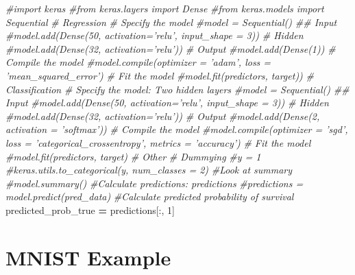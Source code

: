 \documentclass[]{book}
\newenvironment{Shaded}{\begin{snugshade}}{\end{snugshade}}
\newcommand{\DecValTok}[1]{\textcolor[rgb]{0.00,0.00,0.81}{#1}}
\newcommand{\CommentTok}[1]{\textcolor[rgb]{0.56,0.35,0.01}{\textit{#1}}}
\newcommand{\OperatorTok}[1]{\textcolor[rgb]{0.81,0.36,0.00}{\textbf{#1}}}
\newcommand{\NormalTok}[1]{#1}
\begin{document}
\begin{Shaded}
\begin{Highlighting}[]
\CommentTok{#import keras}
\CommentTok{#from keras.layers import Dense}
\CommentTok{#from keras.models import Sequential}
\CommentTok{# Regression}
\CommentTok{# Specify the model}
\CommentTok{#model = Sequential()}
\CommentTok{## Input}
\CommentTok{#model.add(Dense(50, activation='relu', input_shape = 3))}
\CommentTok{# Hidden}
\CommentTok{#model.add(Dense(32, activation='relu'))}
\CommentTok{# Output}
\CommentTok{#model.add(Dense(1))}
\CommentTok{# Compile the model}
\CommentTok{#model.compile(optimizer = 'adam', loss = 'mean_squared_error') }
\CommentTok{# Fit the model}
\CommentTok{#model.fit(predictors, target))}
\CommentTok{# Classification}
\CommentTok{# Specify the model: Two hidden layers}
\CommentTok{#model = Sequential()}
\CommentTok{## Input}
\CommentTok{#model.add(Dense(50, activation='relu', input_shape = 3))}
\CommentTok{# Hidden}
\CommentTok{#model.add(Dense(32, activation='relu'))}
\CommentTok{# Output}
\CommentTok{#model.add(Dense(2, activation = 'softmax'))}
\CommentTok{# Compile the model}
\CommentTok{#model.compile(optimizer = 'sgd', loss = 'categorical_crossentropy', metrics = 'accuracy')}
\CommentTok{# Fit the model}
\CommentTok{#model.fit(predictors, target)}
\CommentTok{# Other}
\CommentTok{# Dummying}
\CommentTok{#y = 1}
\CommentTok{#keras.utils.to_categorical(y, num_classes = 2)}
\CommentTok{#Look at summary}
\CommentTok{#model.summary()}
\CommentTok{#Calculate predictions: predictions}
\CommentTok{#predictions = model.predict(pred_data)}
\CommentTok{#Calculate predicted probability of survival}
\NormalTok{predicted_prob_true }\OperatorTok{=}\NormalTok{ predictions[:, }\DecValTok{1}\NormalTok{]}
\end{Highlighting}
\end{Shaded}

\section{MNIST Example}\label{mnist-example}
\end{document}
